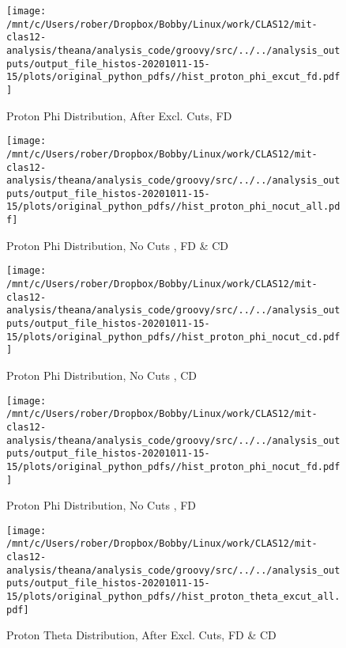 \documentclass{article}
\begin{document}
\begin{landscape}
    \begin{figure}[h]
        \centering

        \texttt{[image: /mnt/c/Users/rober/Dropbox/Bobby/Linux/work/CLAS12/mit-clas12-analysis/theana/analysis\_code/groovy/src/../../analysis\_outputs/output\_file\_histos-20201011-15-15/plots/original\_python\_pdfs//hist\_proton\_phi\_excut\_fd.pdf]}
        \captionsetup{textformat=empty,labelformat=blank}
        \caption{Proton Phi Distribution, After Excl. Cuts, FD}
    \end{figure}
    \clearpage
    
    \begin{figure}[h]
        \centering

        \texttt{[image: /mnt/c/Users/rober/Dropbox/Bobby/Linux/work/CLAS12/mit-clas12-analysis/theana/analysis\_code/groovy/src/../../analysis\_outputs/output\_file\_histos-20201011-15-15/plots/original\_python\_pdfs//hist\_proton\_phi\_nocut\_all.pdf]}
        \captionsetup{textformat=empty,labelformat=blank}
        \caption{Proton Phi Distribution, No Cuts , FD \& CD}
    \end{figure}
    \clearpage
    
    \begin{figure}[h]
        \centering

        \texttt{[image: /mnt/c/Users/rober/Dropbox/Bobby/Linux/work/CLAS12/mit-clas12-analysis/theana/analysis\_code/groovy/src/../../analysis\_outputs/output\_file\_histos-20201011-15-15/plots/original\_python\_pdfs//hist\_proton\_phi\_nocut\_cd.pdf]}
        \captionsetup{textformat=empty,labelformat=blank}
        \caption{Proton Phi Distribution, No Cuts , CD}
    \end{figure}
    \clearpage
    
    \begin{figure}[h]
        \centering

        \texttt{[image: /mnt/c/Users/rober/Dropbox/Bobby/Linux/work/CLAS12/mit-clas12-analysis/theana/analysis\_code/groovy/src/../../analysis\_outputs/output\_file\_histos-20201011-15-15/plots/original\_python\_pdfs//hist\_proton\_phi\_nocut\_fd.pdf]}
        \captionsetup{textformat=empty,labelformat=blank}
        \caption{Proton Phi Distribution, No Cuts , FD}
    \end{figure}
    \clearpage
    
    \begin{figure}[h]
        \centering

        \texttt{[image: /mnt/c/Users/rober/Dropbox/Bobby/Linux/work/CLAS12/mit-clas12-analysis/theana/analysis\_code/groovy/src/../../analysis\_outputs/output\_file\_histos-20201011-15-15/plots/original\_python\_pdfs//hist\_proton\_theta\_excut\_all.pdf]}
        \captionsetup{textformat=empty,labelformat=blank}
        \caption{Proton Theta Distribution, After Excl. Cuts, FD \& CD}
    \end{figure}
    \clearpage
    

\end{landscape}
\end{document}

